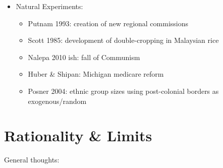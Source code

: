 \documentclass[12pt]{article}
\begin{document}
\begin{itemize}
    \item Natural Experiments:
    \begin{itemize}
        \item Putnam 1993: creation of new regional commissions
        \item Scott 1985: development of double-cropping in Malaysian rice 
        \item Nalepa 2010 ish: fall of Communism
        \item Huber \& Shipan: Michigan medicare reform
        \item Posner 2004: ethnic group sizes using post-colonial borders as exogenous/random
    \end{itemize}
\end{itemize}




\section*{Rationality \& Limits}

General thoughts: 
\end{document}

